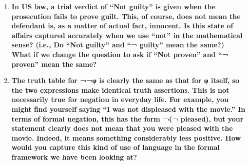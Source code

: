 \documentclass[12pt, letterpaper]{article}
\begin{document}
\begin{enumerate}
\item \textbf{In US law, a trial verdict of “Not guilty” is given when the prosecution fails to prove guilt. This, of
course, does not mean the defendant is, as a matter of actual fact, innocent. Is this state of affairs
captured accurately when we use “not” in the mathematical sense? (i.e., Do “Not guilty” and “¬
guilty” mean the same?) What if we change the question to ask if “Not proven” and “¬ proven”
mean the same?}
\item \textbf{The truth table for ¬¬φ is clearly the same as that for φ itself, so the two expressions make identical
truth assertions. This is not necessarily true for negation in everyday life. For example, you might
find yourself saying “I was not displeased with the movie.” In terms of formal negation, this has
the form ¬(¬ pleased), but your statement clearly does not mean that you were pleased with the
movie. Indeed, it means something considerably less positive. How would you capture this kind of
use of language in the formal framework we have been looking at?}



\end{enumerate}
\end{document}
